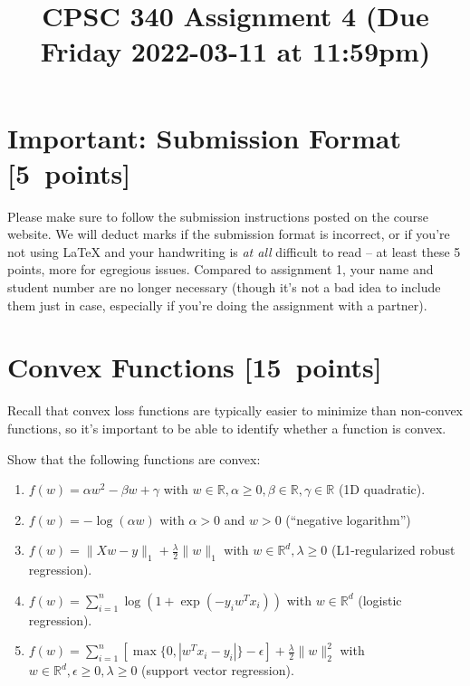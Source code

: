 \documentclass{article}
\newcommand{\blu}[1]{{\textcolor{blu}{#1}}}
\let\ask\blu
\newcommand\pts[1]{\textcolor{pointscolour}{[#1~points]}}
\def\R{\mathbb{R}}
\newcommand{\norm}[1]{\lVert #1 \rVert}
\begin{document}
\title{CPSC 340 Assignment 4 (Due Friday 2022-03-11 at 11:59pm)}
\date{}
\maketitle

\vspace{-4em}


\section*{Important: Submission Format \pts{5}}

    Please make sure to follow the submission instructions posted on the course website.
    \ask{We will deduct marks if the submission format is incorrect, or if you're not using \LaTeX{} and your handwriting is \emph{at all} difficult to read} -- at least these 5 points, more for egregious issues.
    Compared to assignment 1, your name and student number are no longer necessary (though it's not a bad idea to include them just in case, especially if you're doing the assignment with a partner).

\section{Convex Functions \pts{15}}

Recall that convex loss functions are typically easier to minimize than non-convex functions, so it's important to be able to identify whether a function is convex.

\ask{Show that the following functions are convex}:

\begin{enumerate}
\item $f(w) = \alpha w^2 - \beta w + \gamma$ with $w \in \R, \alpha \geq 0, \beta \in \R, \gamma \in \R$ (1D quadratic).

\item $f(w) = -\log(\alpha w) $ with $\alpha > 0$ and $w > 0$ (``negative logarithm'')

\item $f(w) = \norm{Xw-y}_1 + \frac{\lambda}{2}\norm{w}_1$ with $w \in \R^d, \lambda \geq 0$ (L1-regularized robust regression).

\item $f(w) = \sum_{i=1}^n \log(1+\exp(-y_iw^Tx_i)) $ with $w \in \R^d$ (logistic regression).

\item $f(w) = \sum_{i=1}^n[\max\{0,|w^Tx_i - y_i|\} - \epsilon] + \frac{\lambda}{2}\norm{w}_2^2$  with $w \in \R^d, \epsilon \geq 0, \lambda \geq 0$ (support vector regression).
\end{enumerate}
\end{document}

